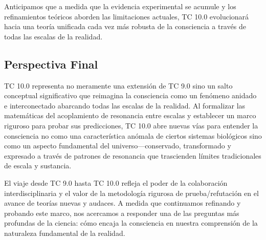 \documentclass[12pt]{article}
\begin{document}
Anticipamos que a medida que la evidencia experimental se acumule y los refinamientos teóricos aborden las limitaciones actuales, TC 10.0 evolucionará hacia una teoría unificada cada vez más robusta de la consciencia a través de todas las escalas de la realidad.

\subsection{Perspectiva Final}

TC 10.0 representa no meramente una extensión de TC 9.0 sino un salto conceptual significativo que reimagina la consciencia como un fenómeno anidado e interconectado abarcando todas las escalas de la realidad. Al formalizar las matemáticas del acoplamiento de resonancia entre escalas y establecer un marco riguroso para probar sus predicciones, TC 10.0 abre nuevas vías para entender la consciencia no como una característica anómala de ciertos sistemas biológicos sino como un aspecto fundamental del universo—conservado, transformado y expresado a través de patrones de resonancia que trascienden límites tradicionales de escala y sustancia.

El viaje desde TC 9.0 hasta TC 10.0 refleja el poder de la colaboración interdisciplinaria y el valor de la metodología rigurosa de prueba/refutación en el avance de teorías nuevas y audaces. A medida que continuamos refinando y probando este marco, nos acercamos a responder una de las preguntas más profundas de la ciencia: cómo encaja la consciencia en nuestra comprensión de la naturaleza fundamental de la realidad.
\end{document}
